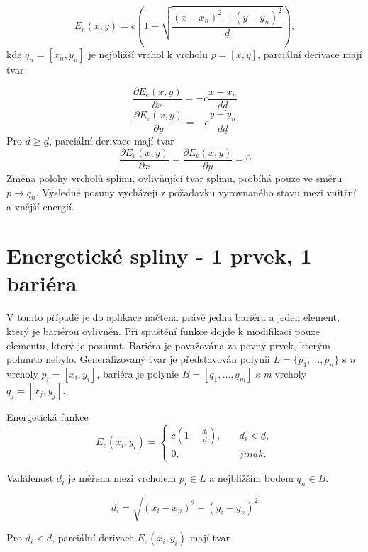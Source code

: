 \documentclass[oneside,12pt,a4paper]{book}
\begin{document}
\begin{equation}
E_e(x,y) = c \left(1-\sqrt{\frac{(x-x_n)^2 + (y-y_n)^2}{\underline{d}}}\right),
\end{equation}
kde $ q_n = [x_n,y_n]$ je nejbližší vrchol k vrcholu $p = [x,y]$, parciální derivace mají tvar

\begin{equation}
 \frac{\partial E_e(x,y)}{\partial x} = -c\frac{x-x_n}{d\underline{d}}
\end{equation}
\begin{equation}
\frac{\partial E_e(x,y)}{\partial y} = -c\frac{y-y_n}{d\underline{d}}
\end{equation}
Pro $d \geq \underline{d}$, parciální derivace mají tvar
\begin{equation}
 \frac{\partial E_e(x,y)}{\partial x} = \frac{\partial E_e(x,y)}{\partial y} = 0
\end{equation}
Změna polohy vrcholů splinu, ovlivňující tvar splinu, probíhá pouze ve směru $ p \rightarrow q_n$. Výsledné posuny vycházejí z požadavku vyrovnaného stavu mezi vnitřní a vnější energií.


\section{Energetické spliny - 1 prvek, 1 bariéra}
V tomto případě je do aplikace načtena právě jedna bariéra a jeden element, který je bariérou ovlivněn. Při spuštění funkce dojde k modifikaci pouze elementu, který je posunut. Bariéra je považována za pevný prvek, kterým pohnuto nebylo. Generalizovaný tvar je představován polynií $L = \{p_1,...,p_n\}$ s \emph{n} vrcholy $p_i = [x_i,y_i]$, bariéra je polynie $B = [q_1,...,q_m]$ s \emph{m} vrcholy $q_j = [x_j,y_j]$.

Energetická funkce
\begin{equation}
 E_e(x_i,y_i) =
  \begin{cases}
    c(1-\frac{d_i}{\underline{d}}),       & \quad d_i<\underline{d},\\
    0,  & \quad jinak,
  \end{cases}
\end{equation}

Vzdálenost $d_i$ je měřena mezi vrcholem $p_i \in L$ a nejbližším bodem $q_n \in B$. 

\begin{equation}
d_i = \sqrt{(x_i-x_n)^2 + (y_i-y_n)^2}
\end{equation}

Pro $d_i < \underline{d}$, parciální derivace $E_e(x_i,y_i)$ mají tvar
\end{document}
